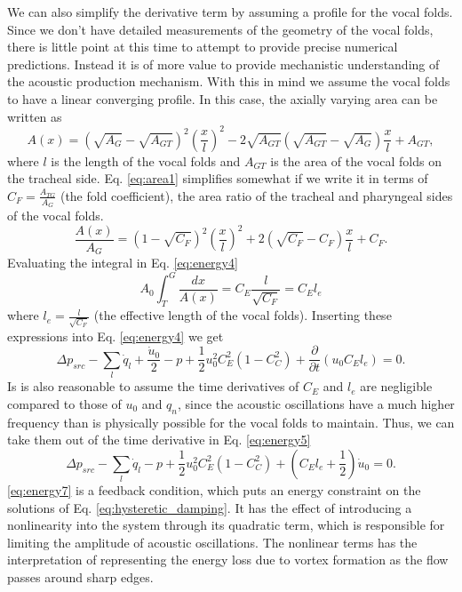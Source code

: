 \documentclass[superscriptaddress, onecolumn, prl]{revtex4}
\begin{document}
We can also simplify the derivative term by assuming a profile for the vocal folds. Since we don't have detailed measurements of the geometry of the vocal folds, there is little point at this time to attempt to provide precise numerical predictions. Instead it is of more value to provide mechanistic understanding of the acoustic production mechanism. With this in mind we assume the vocal folds to have a linear converging profile. In this case, the axially varying area can be written as 
\begin{equation}
\label{eq:area1}
A(x)= \left(\sqrt{A_G}-\sqrt{A_{GT}}\right)^2 \left(\frac{x}{l}  \right)^2- 2 \sqrt{A_{GT}} \left(\sqrt{A_{GT}}-\sqrt{A_G}\right)\frac{x}{l}+A_{GT},
\end{equation}
where $l$ is the length of the vocal folds and $A_{GT}$ is the area of the vocal folds on the tracheal side. Eq. \ref{eq:area1} simplifies somewhat if we write it in terms of $C_F = \frac{A_{TG}}{A_G}$ (the fold coefficient), the area ratio of the tracheal and pharyngeal sides of the vocal folds.
\begin{equation}
\label{eq:area2}
\frac{A(x)}{A_G} = \left( 1-\sqrt{C_F} \right)^2 \left( \frac{x}{l} \right)^2 + 2\left( \sqrt{C_F} - C_F \right) \frac{x}{l} + C_F.
\end{equation}
Evaluating the integral in Eq. \ref{eq:energy4}
\begin{equation}
A_0 \int_{T}^{G} \frac{dx}{A(x)} = C_E  \frac{l}{\sqrt{C_F}} = C_E l_e
\end{equation}
where $l_e =  \frac{l}{\sqrt{C_F}}$ (the effective length of the vocal folds). Inserting these expressions into Eq. \ref{eq:energy4} we get
\begin{equation}
\label{eq:energy6}
\Delta p_{src}-\sum_l{\dot{q}_l} + \frac{\dot{u}_0}{2} - p + \frac{1}{2} u_{0}^2 C_E^2 \left( 1 - C_C^2 \right) + \frac{\partial}{\partial t}( u_{0} C_E l_e ) = 0.
\end{equation} 
Is is also reasonable to assume the time derivatives of $C_E$ and $l_e$ are negligible compared to those of $u_0$ and $q_n$, since the acoustic oscillations have a much higher frequency than is physically possible for the vocal folds to maintain. Thus, we can take them out of the time derivative in Eq. \ref{eq:energy5}
\begin{equation}
\label{eq:energy7}
\Delta p_{src}-\sum_l{\dot{q}_l} - p + \frac{1}{2} u_{0}^2 C_E^2 \left( 1 - C_C^2 \right) + \left( C_E l_e + \frac{1}{2}  \right) \dot{u}_0 = 0.
\end{equation} 
\ref{eq:energy7} is a feedback condition, which puts an energy constraint on the solutions of Eq. \ref{eq:hysteretic_damping}. It has the effect of introducing a nonlinearity into the system through its quadratic term, which is responsible for limiting the amplitude of acoustic oscillations. The nonlinear terms has the interpretation of representing the energy loss due to vortex formation as the flow passes around sharp edges.
\end{document}
